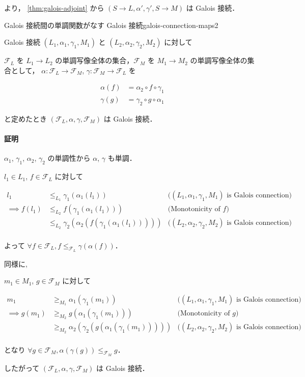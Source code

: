 \documentclass[uplatex]{jsarticle}
\begin{document}
より， \ref{thm:galois-adjoint} から $(S \to L, \alpha', \gamma', S \to M)$ は Galois 接続．


\begin{boxtheorem}{Galois 接続間の単調関数がなす Galois 接続}{galois-connection-maps2}


  Galois 接続 $(L_1, \alpha_1, \gamma_1, M_1)$ と $(L_2, \alpha_2, \gamma_2, M_2)$ に対して

  $\mathcal{F}_L$ を $L_1 \to L_2$ の単調写像全体の集合，$\mathcal{F}_M$ を $M_1 \to M_2$ の単調写像全体の集合として，
  $\alpha: \mathcal{F}_L \to \mathcal{F}_M$, $\gamma: \mathcal{F}_M \to \mathcal{F}_L$ を

  \begin{align*}
    \alpha(f) & = \alpha_2 \circ f \circ \gamma_1 \\
    \gamma(g) & = \gamma_2 \circ g \circ \alpha_1
  \end{align*}

  と定めたとき
  $(\mathcal{F}_L, \alpha, \gamma, \mathcal{F}_M)$ は Galois 接続．
\end{boxtheorem}

\paragraph*{証明}


$\alpha_1$, $\gamma_1$, $\alpha_2$, $\gamma_2$ の単調性から $\alpha$, $\gamma$ も単調．

$l_1 \in L_1$, $f \in \mathcal{F}_L$ に対して

\begin{align*}
  l_1              & \leq_{L_1} \gamma_1(\alpha_1(l_1))              & \text{($(L_1, \alpha_1, \gamma_1, M_1)$ is Galois connection)} \\
  \implies  f(l_1) & \leq_{L_2} f(\gamma_1(\alpha_1(l_1)))           & \text{(Monotonicity of $f$)}                                   \\
                   & \leq_{L_2} \gamma_2(\alpha_2(f(\gamma_1(\alpha_1(l_1))))) & \text{($(L_2, \alpha_2, \gamma_2, M_2)$ is Galois connection)} \\
\end{align*}

よって $\forall f \in \mathcal{F}_L, f \leq_{\mathcal{F}_L} \gamma(\alpha(f))$．

同様に,

$m_1 \in M_1$, $g \in \mathcal{F}_M$ に対して

\begin{align*}
  m_1              & \geq_{M_1} \alpha_1(\gamma_1(m_1))              & \text{($(L_1, \alpha_1, \gamma_1, M_1)$ is Galois connection)} \\
  \implies  g(m_1) & \geq_{M_2} g(\alpha_1(\gamma_1(m_1)))           & \text{(Monotonicity of $g$)}                                   \\
                   & \geq_{M_2} \alpha_2(\gamma_2(g(\alpha_1(\gamma_1(m_1))))) & \text{($(L_2, \alpha_2, \gamma_2, M_2)$ is Galois connection)} \\
\end{align*}

となり $\forall g \in \mathcal{F}_M, \alpha(\gamma(g)) \leq_{\mathcal{F}_M} g$．

したがって $(\mathcal{F}_L, \alpha, \gamma, \mathcal{F}_M)$ は Galois 接続．
\end{document}
